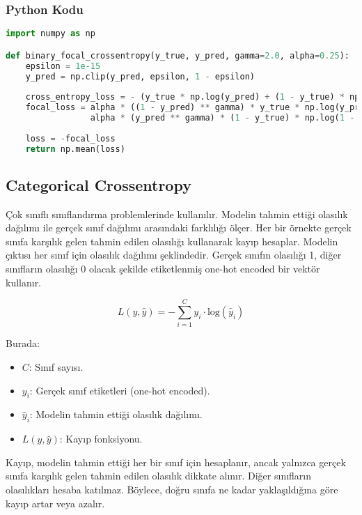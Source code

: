 \subsubsection{Python Kodu}

\begin{lstlisting}[language=Python]
import numpy as np

def binary_focal_crossentropy(y_true, y_pred, gamma=2.0, alpha=0.25):
    epsilon = 1e-15
    y_pred = np.clip(y_pred, epsilon, 1 - epsilon)
    
    cross_entropy_loss = - (y_true * np.log(y_pred) + (1 - y_true) * np.log(1 - y_pred))
    focal_loss = alpha * ((1 - y_pred) ** gamma) * y_true * np.log(y_pred) + \
                 alpha * (y_pred ** gamma) * (1 - y_true) * np.log(1 - y_pred)
    
    loss = -focal_loss
    return np.mean(loss)
\end{lstlisting}

\newpage

\subsection{Categorical Crossentropy}

Çok sınıflı sınıflandırma problemlerinde kullanılır. Modelin tahmin ettiği olasılık dağılımı ile gerçek sınıf dağılımı arasındaki farklılığı ölçer. Her bir örnekte gerçek sınıfa karşılık gelen tahmin edilen olasılığı kullanarak kayıp hesaplar. Modelin çıktısı her sınıf için olasılık dağılımı şeklindedir. Gerçek sınıfın olasılığı 1, diğer sınıfların olasılığı 0 olacak şekilde etiketlenmiş one-hot encoded bir vektör kullanır.

\[ L(y, \hat{y}) = - \sum_{i=1}^{C} y_i \cdot \text{log}(\hat{y}_i) \]

Burada:

\begin{itemize}
    \item $C$: Sınıf sayısı.
    \item $y_i$: Gerçek sınıf etiketleri (one-hot encoded).
    \item $\hat{y}_i$: Modelin tahmin ettiği olasılık dağılımı.
    \item $L(y, \hat{y})$: Kayıp fonksiyonu.
\end{itemize}

Kayıp, modelin tahmin ettiği her bir sınıf için hesaplanır, ancak yalnızca gerçek sınıfa karşılık gelen tahmin edilen olasılık dikkate alınır. Diğer sınıfların olasılıkları hesaba katılmaz. Böylece, doğru sınıfa ne kadar yaklaşıldığına göre kayıp artar veya azalır.

